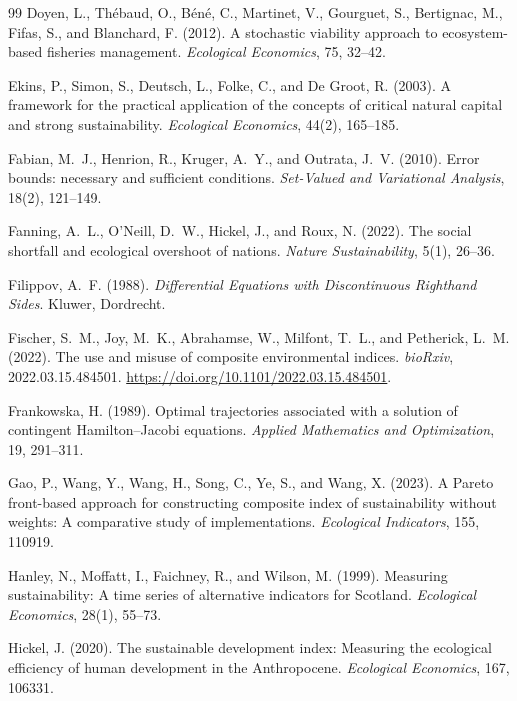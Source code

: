 \begin{thebibliography}{99}
 Doyen, L., Th\'ebaud, O., B\'en\'e, C., Martinet, V., Gourguet, S., Bertignac, M., Fifas, S., and Blanchard, F. (2012). A stochastic viability approach to ecosystem-based fisheries management. \emph{Ecological Economics}, 75, 32--42.

 Ekins, P., Simon, S., Deutsch, L., Folke, C., and De Groot, R. (2003). A framework for the practical application of the concepts of critical natural capital and strong sustainability. \emph{Ecological Economics}, 44(2), 165--185.

 Fabian, M.~J., Henrion, R., Kruger, A.~Y., and Outrata, J.~V. (2010). Error bounds: necessary and sufficient conditions. \emph{Set-Valued and Variational Analysis}, 18(2), 121--149.

 Fanning, A.~L., O'Neill, D.~W., Hickel, J., and Roux, N. (2022). The social shortfall and ecological overshoot of nations. \emph{Nature Sustainability}, 5(1), 26--36.

 Filippov, A.~F. (1988). \emph{Differential Equations with Discontinuous Righthand Sides}. Kluwer, Dordrecht.

 Fischer, S.~M., Joy, M.~K., Abrahamse, W., Milfont, T.~L., and Petherick, L.~M. (2022). The use and misuse of composite environmental indices. \emph{bioRxiv}, 2022.03.15.484501. \url{https://doi.org/10.1101/2022.03.15.484501}.

 Frankowska, H. (1989). Optimal trajectories associated with a solution of contingent Hamilton--Jacobi equations. \emph{Applied Mathematics and Optimization}, 19, 291--311.

 Gao, P., Wang, Y., Wang, H., Song, C., Ye, S., and Wang, X. (2023). A Pareto front-based approach for constructing composite index of sustainability without weights: A comparative study of implementations. \emph{Ecological Indicators}, 155, 110919.

 Hanley, N., Moffatt, I., Faichney, R., and Wilson, M. (1999). Measuring sustainability: A time series of alternative indicators for Scotland. \emph{Ecological Economics}, 28(1), 55--73.

 Hickel, J. (2020). The sustainable development index: Measuring the ecological efficiency of human development in the Anthropocene. \emph{Ecological Economics}, 167, 106331.


\end{thebibliography}
